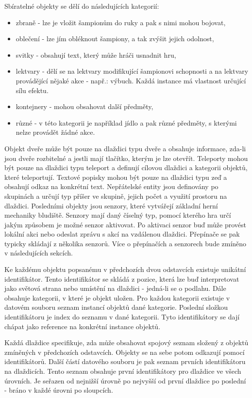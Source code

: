 Sbíratelné objekty se dělí do následujících kategorií:
\begin{itemize}
\item zbraně - lze je vložit šampionům do ruky a pak s nimi mohou bojovat,
\item oblečení - lze jím obléknout šampiony, a tak zvýšit jejich odolnost,
\item svitky - obsahují text, který může hráči usnadnit hru, 
\item lektvary - dělí se na lektvary modifikující šampionovi schopnosti a na lektvary provádějící nějaké
	akce - např.: výbuch. Každá instance má vlastnost určující sílu efektu.
\item kontejnery - mohou obsahovat další předměty,
\item různé - v této kategorii je například jídlo a pak různé předměty, s kterými nelze provádět žádné akce.
\end{itemize}


Objekt dveře může být pouze na dlaždici typu dveře a obsahuje informace, zda-li jsou dveře rozbitelné a jestli 
mají tlačítko, kterým je lze otevřít. Teleporty mohou být pouze na dlaždici typu teleport a 
definují cílovou dlaždici a kategorii objektů, které teleportují. Textové popisky mohou být pouze na 
dlaždici typu zeď a obsahují odkaz na konkrétní text. Nepřátelské entity jsou definovány po skupinách a určují 
typ příšer ve skupině, jejich počet a využití prostoru na dlaždici. Posledními objekty jsou senzory, 
které vytvářejí základní herní mechaniky bludiště. Senzory mají daný číselný typ, pomocí kterého hra 
určí jakým způsobem je možné senzor
aktivovat. Po aktivaci senzor buď může provést lokální akci nebo odeslat zprávu s akcí na vzdálenou 
dlaždici. Přepínače se pak typicky skládají z několika senzorů. Více o přepínačích a senzorech bude zmíněno
v následujících sekcích. 

Ke každému objektu popsanému v předchozích dvou odstavcích existuje unikátní identifikátor. 
Tento identifikátor se skládá z pozice, která lze buď interpretovat jako světová strana nebo 
umístění na dlaždici - jedná-li se o podlahu. Dále obsahuje kategorii, v které je objekt
uložen. Pro každou kategorii existuje
v datovém souboru seznam instancí objektů dané kategorie. Poslední složkou identifikátoru 
je index do seznamu v dané kategorii. Tyto identifikátory se dají chápat jako reference 
na konkrétní instance objektů.

Každá dlaždice specifikuje, zda může obsahovat spojový seznam složený z objektů zmíněných v předchozích odstavcích. 
Objekty se na sebe potom odkazují pomocí identifikátorů. Další částí datového souboru je pak 
seznam prvních identifikátoru na dlaždicích. Tento seznam obsahuje první identifikátory pro dlaždice
ve všech úrovních. Je seřazen od nejnižší úrovně po nejvyšší od první dlaždice po poslední - bráno  
v každé úrovni po sloupcích.

